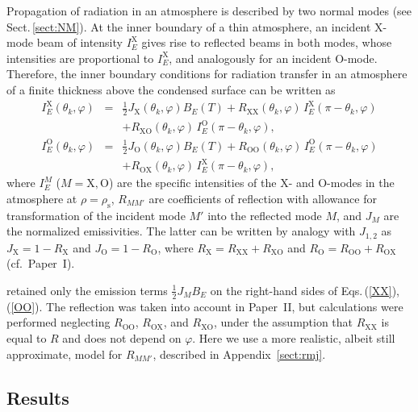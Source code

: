 \documentclass{aa}
\newcommand{\bea}{\begin{eqnarray}}
\newcommand{\eea}{\end{eqnarray}}
\begin{document}
Propagation of radiation in an atmosphere is described by
two normal modes (see Sect.\,\ref{sect:NM}).  At the inner
boundary of a thin atmosphere, an incident X-mode beam of
intensity $I_{E}^{\mathrm{X}}$ gives rise to reflected beams
in both modes, whose intensities are proportional to
$I_{E}^{\mathrm{X}}$, and analogously for an incident
O-mode. Therefore,  the inner boundary conditions for
radiation transfer in an atmosphere of a finite thickness
above the condensed surface can be written as
\bea
   I_{E}^{\mathrm{X}}(\theta_k,\varphi) &=& 
   \textstyle\frac12
      J_\mathrm{X}(\theta_k,\varphi)
      B_E(T)
       + R_\mathrm{XX}(\theta_k,\varphi)\,
        I_{E}^{\mathrm{X}}(\pi-\theta_k,\varphi)
\nonumber\\&&
        + R_\mathrm{XO}(\theta_k,\varphi)\,
        I_{E}^{\mathrm{O}}(\pi-\theta_k,\varphi),
\label{XX}
\\
   I_{E}^{\mathrm{O}}(\theta_k,\varphi) &=& 
   \textstyle\frac12
      J_\mathrm{O}(\theta_k,\varphi)
      B_E(T)
       + R_\mathrm{OO}(\theta_k,\varphi)\,
        I_{E}^{\mathrm{O}}(\pi-\theta_k,\varphi)
\nonumber\\&&
        + R_\mathrm{OX}(\theta_k,\varphi)\,
        I_{E}^{\mathrm{X}}(\pi-\theta_k,\varphi),
\label{OO}
\eea
where $I_{E}^M$  ($M=\mathrm{X,O}$) 
are the specific intensities of 
the X- and O-modes in the atmosphere 
at $\rho=\rho_\mathrm{s}$,
$R_{MM'}$ are 
coefficients of reflection with allowance for 
transformation of the incident mode $M'$ into the reflected mode
$M$,
and $J_M$ are the normalized emissivities.
The latter can be written by analogy with $J_{1,2}$ as
$J_\mathrm{X}=1-R_\mathrm{X}$ and $J_\mathrm{O}=1-R_\mathrm{O}$,
where $R_\mathrm{X}=R_\mathrm{XX}+R_\mathrm{XO}$
and $R_\mathrm{O}=R_\mathrm{OO}+R_\mathrm{OX}$
(cf.\ Paper~I). 

\citet{Ho-ea07} retained only the emission terms $\frac12 J_M B_E$ on
the right-hand sides of Eqs.\,(\ref{XX}), (\ref{OO}). The
reflection was taken into account in Paper~II, but
calculations were performed neglecting $R_\mathrm{OO}$,
$R_\mathrm{OX}$, and $R_\mathrm{XO}$, under the
assumption that $R_\mathrm{XX}$ is equal to $R$ and does
not depend on $\varphi$. Here
we use a more realistic,
albeit still approximate, model for $R_{MM'}$, described in
Appendix~\ref{sect:rmj}.

\subsection{Results}
\label{sect:res}
\end{document}
